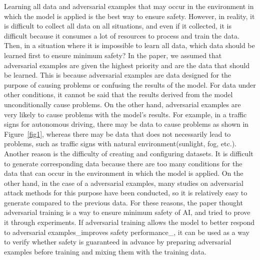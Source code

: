 \documentclass[journal,article,submit,moreauthors,pdftex]{Definitions/mdpi}
\begin{document}
Learning all data and adversarial examples that may occur in the environment in which the model is applied is the best way to ensure safety.
However, in reality, it is difficult to collect all data on all situations, and even if it collected, it is difficult because it consumes a lot of resources to process and train the data.
Then, in a situation where it is impossible to learn all data, which data should be learned first to ensure minimum safety?
In the paper, we assumed that adversarial examples are given the highest priority and are the data that should be learned.
This is because adversarial examples are data designed for the purpose of causing problems or confusing the results of the model.
For data under other conditions, it cannot be said that the results derived from the model unconditionally cause problems.
On the other hand, adversarial examples are very likely to cause problems with the model's results.
For example, in a traffic signs for autonomous driving, there may be data to cause problems as shown in Figure~\ref{fig1}, whereas there may be data that does not necessarily lead to problems, such as traffic signs with natural environment(sunlight, fog, etc.).
Another reason is the difficulty of creating and configuring datasets. It is difficult to generate corresponding data because there are too many conditions for the data that can occur in the environment in which the model is applied.
On the other hand, in the case of a adversarial examples, many studies on adversarial attack methods for this purpose have been conducted, so it is relatively easy to generate compared to the previous data.
For these reasons, the paper thought adversarial training is a way to ensure minimum safety of AI, and tried to prove it through experiments.
If adversarial training allows the model to better respond to adversarial examples\_improves safety performance\_, it can be used as a way to verify whether safety is guaranteed in advance by preparing adversarial examples before training and mixing them with the training data. \\
\end{document}
